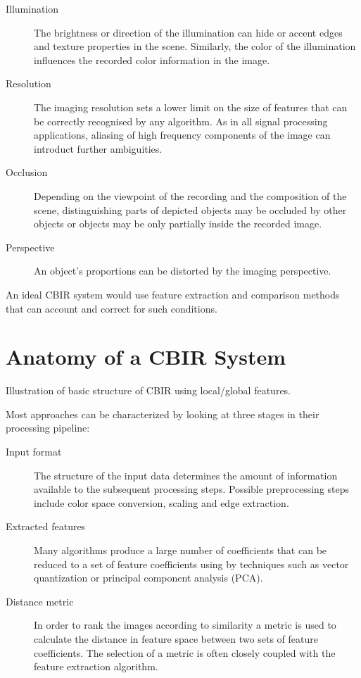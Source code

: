 \begin{description}
    \item[Illumination] The brightness or direction of the illumination can
        hide or accent edges and texture properties in the scene. Similarly,
        the color of the illumination influences the recorded color information
        in the image.
    \item[Resolution] The imaging resolution sets a lower limit on the size of
        features that can be correctly recognised by any algorithm. As in all
        signal processing applications, aliasing of high frequency components
        of the image can introduct further ambiguities.
        \autocite{shannon_communication_1998}
    \item[Occlusion] Depending on the viewpoint of the recording and the
        composition of the scene, distinguishing parts of depicted objects may
        be occluded by other objects or objects may be only partially inside
        the recorded image.
    \item[Perspective] An object's proportions can be distorted by the imaging
        perspective.
\end{description}

An ideal CBIR system would use feature extraction and comparison methods that
can account and correct for such conditions.

\section{Anatomy of a CBIR System}
Illustration of basic structure of CBIR using local/global features.

Most approaches can be characterized by looking at three stages in their processing pipeline:

\begin{description}
    \item[Input format] The structure of the input data determines the amount of information available to the subsequent processing steps. Possible preprocessing steps include color space conversion, scaling and edge extraction.
    \item[Extracted features] Many algorithms produce a large number of coefficients that can be reduced to a set of feature coefficients using by techniques such as vector quantization or principal component analysis (PCA).
    \item[Distance metric] In order to rank the images according to similarity a metric is used to calculate the distance in feature space between two sets of feature coefficients. The selection of a metric is often closely coupled with the feature extraction algorithm.
\end{description}


